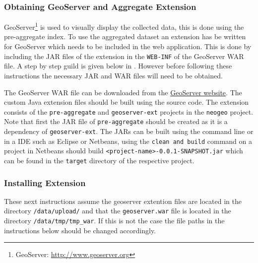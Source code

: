 \subsubsection{Obtaining GeoServer and Aggregate Extension}
GeoServer\footnote{GeoServer: \url{http://www.geoserver.org}} is used to visually display the collected data, this is done using the pre-aggregate index. To use the aggregated dataset an extension has be written for GeoServer which needs to be included in the web application. This is done by including the JAR files of the extension in the \lstinline|WEB-INF| of the GeoServer WAR file. A step by step guild is given below in . However before following these instructions the necessary JAR and WAR files will need to be obtained.

The GeoServer WAR file can be downloaded from the \href{http://www.geoserver.org/download/}{GeoServer website}. The custom Java extension files should be built using the source code. The extension consists of the \lstinline|pre-aggregate| and \lstinline|geoserver-ext| projects in the \lstinline|neogeo| project. Note that first the JAR file of \lstinline|pre-aggregate| should be created as it is a dependency of \lstinline|geoserver-ext|. The JARs can be built using the command line or in a IDE such as Eclipse or Netbeans, using the \lstinline|clean and build| command on a project in Netbeans should build \lstinline|<project-name>-0.0.1-SNAPSHOT.jar| which can be found in the \lstinline|target| directory of the respective project.

\subsubsection{Installing Extension}
\label{sec:InstallExtension}
\noindent These next instructions assume the geoserver extention files are located in the directory \lstinline|/data/upload/| and that the \lstinline|geoserver.war| file is located in the directory \mbox{\lstinline|/data/tmp/tmp_war|}. If this is not the case the file paths in the instructions below should be changed accordingly. \newline

